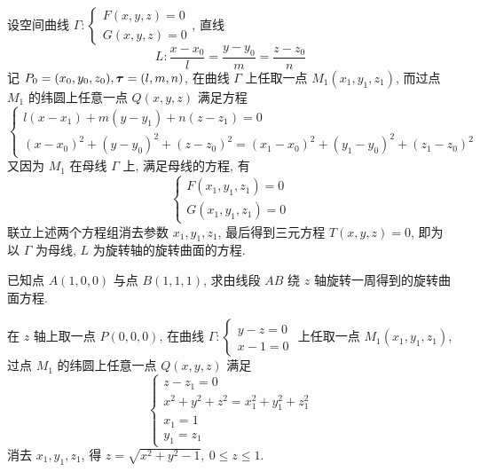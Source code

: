 \begin{theorem}[空间曲线绕直线旋转的曲面方程]
    设空间曲线 $\Gamma:\begin{cases}
            F(x,y,z)=0 \\
            G(x,y,z)=0
        \end{cases}$, 直线 $$L:\dfrac{x-x_0}{l}=\dfrac{y-y_0}{m}=\dfrac{z-z_0}{n}$$
    记 $P_0=(x_0,y_0,z_0),\vb*{\tau}=(l,m,n)$, 在曲线 $\Gamma$ 上任取一点 $M_1(x_1,y_1,z_1)$,
    而过点 $M_1$ 的纬圆上任意一点 $Q(x,y,z)$ 满足方程
    $$
        \begin{cases}
            l(x-x_1)+m(y-y_1)+n(z-z_1)=0 \\
            (x-x_0)^2+(y-y_0)^2+(z-z_0)^2=(x_1-x_0)^2+(y_1-y_0)^2+(z_1-z_0)^2
        \end{cases}
    $$
    又因为 $M_1$ 在母线 $\Gamma$ 上, 满足母线的方程, 有
    $$
        \begin{cases}
            F(x_1, y_1, z_1)=0 \\
            G(x_1, y_1, z_1)=0
        \end{cases}
    $$
    联立上述两个方程组消去参数 $x_1,y_1,z_1$, 最后得到三元方程 $T(x,y,z)=0$, 即为以 $\Gamma$ 为母线, $L$ 为旋转轴的旋转曲面的方程.
\end{theorem}

\begin{example}
    已知点 $A(1,0,0)$ 与点 $B(1,1,1)$, 求由线段 $AB$ 绕 $z$ 轴旋转一周得到的旋转曲面方程.
\end{example}
\begin{solution}
    在 $z$ 轴上取一点 $P(0,0,0)$, 在曲线 $\Gamma:\begin{cases}
            y-z=0 \\
            x-1=0
        \end{cases}$ 上任取一点 $M_1(x_1,y_1,z_1)$, 过点 $M_1$ 的纬圆上任意一点 $Q(x,y,z)$ 满足
    $$
        \begin{cases}
            z-z_1=0                       \\
            x^2+y^2+z^2=x_1^2+y_1^2+z_1^2 \\
            x_1=1                         \\
            y_1=z_1
        \end{cases}
    $$
    消去 $x_1, y_1, z_1$, 得 $z=\sqrt{x^2+y^2-1},~0\leqslant z\leqslant 1.$
\end{solution}

